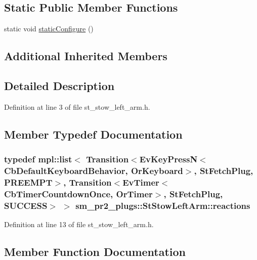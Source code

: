 \subsection*{Static Public Member Functions}
\begin{DoxyCompactItemize}
\item 
static void \hyperlink{structsm__pr2__plugs_1_1StStowLeftArm_a3075009fd893f157279494836e4af96d}{static\+Configure} ()
\end{DoxyCompactItemize}
\subsection*{Additional Inherited Members}


\subsection{Detailed Description}


Definition at line 3 of file st\+\_\+stow\+\_\+left\+\_\+arm.\+h.



\subsection{Member Typedef Documentation}
\subsubsection[{\texorpdfstring{reactions}{reactions}}]{\setlength{\rightskip}{0pt plus 5cm}typedef mpl\+::list$<$ Transition$<$Ev\+Key\+PressN$<$Cb\+Default\+Keyboard\+Behavior, {\bf Or\+Keyboard}$>$, {\bf St\+Fetch\+Plug}, {\bf P\+R\+E\+E\+M\+PT}$>$, Transition$<$Ev\+Timer$<$Cb\+Timer\+Countdown\+Once, {\bf Or\+Timer}$>$, {\bf St\+Fetch\+Plug}, {\bf S\+U\+C\+C\+E\+SS}$>$ $>$ {\bf sm\+\_\+pr2\+\_\+plugs\+::\+St\+Stow\+Left\+Arm\+::reactions}}\hypertarget{structsm__pr2__plugs_1_1StStowLeftArm_a87f889e0a7e42c40fabfc6d4af5256f0}{}\label{structsm__pr2__plugs_1_1StStowLeftArm_a87f889e0a7e42c40fabfc6d4af5256f0}


Definition at line 13 of file st\+\_\+stow\+\_\+left\+\_\+arm.\+h.



\subsection{Member Function Documentation}
